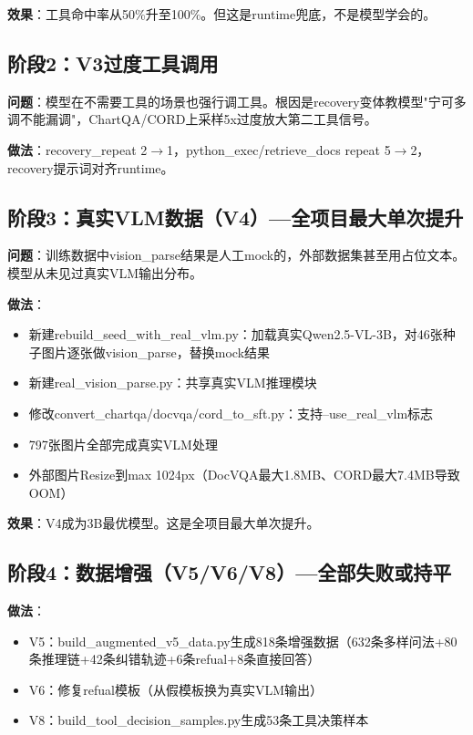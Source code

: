 \documentclass[fontset=none,11pt,a4paper]{ctexart}
\begin{document}
\textbf{效果}：工具命中率从50\%升至100\%。但这是runtime兜底，不是模型学会的。

\subsection{阶段2：V3过度工具调用}

\textbf{问题}：模型在不需要工具的场景也强行调工具。根因是recovery变体教模型"宁可多调不能漏调"，ChartQA/CORD上采样5x过度放大第二工具信号。

\textbf{做法}：recovery\_repeat 2$\to$1，python\_exec/retrieve\_docs repeat 5$\to$2，recovery提示词对齐runtime。

\subsection{阶段3：真实VLM数据（V4）---全项目最大单次提升}

\textbf{问题}：训练数据中vision\_parse结果是人工mock的，外部数据集甚至用占位文本。模型从未见过真实VLM输出分布。

\textbf{做法}：
\begin{itemize}[nosep]
    \item 新建rebuild\_seed\_with\_real\_vlm.py：加载真实Qwen2.5-VL-3B，对46张种子图片逐张做vision\_parse，替换mock结果
    \item 新建real\_vision\_parse.py：共享真实VLM推理模块
    \item 修改convert\_chartqa/docvqa/cord\_to\_sft.py：支持--use\_real\_vlm标志
    \item 797张图片全部完成真实VLM处理
    \item 外部图片Resize到max 1024px（DocVQA最大1.8MB、CORD最大7.4MB导致OOM）
\end{itemize}

\textbf{效果}：V4成为3B最优模型。这是全项目最大单次提升。

\subsection{阶段4：数据增强（V5/V6/V8）---全部失败或持平}

\textbf{做法}：
\begin{itemize}[nosep]
    \item V5：build\_augmented\_v5\_data.py生成818条增强数据（632条多样问法+80条推理链+42条纠错轨迹+6条refual+8条直接回答）
    \item V6：修复refual模板（从假模板换为真实VLM输出）
    \item V8：build\_tool\_decision\_samples.py生成53条工具决策样本
\end{itemize}
\end{document}
